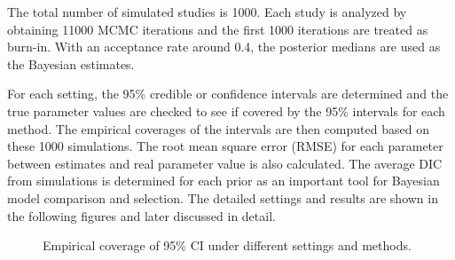 \documentclass[Proceedings]{ascelike}
\begin{document}
The total number of simulated studies is 1000. Each study is analyzed by obtaining 11000 MCMC iterations and the first 1000 iterations are treated as burn-in. With an acceptance rate around 0.4, the posterior medians are used as the Bayesian estimates.

For each setting, the 95\% credible or confidence intervals are determined and the true parameter values are checked to see if covered by the 95\% intervals for each method. The empirical coverages of the intervals are then computed based on these 1000 simulations. The root mean square error (RMSE) for each parameter between estimates and real parameter value is also calculated. The average DIC from simulations is determined for each prior as an important tool for Bayesian model comparison and selection. The detailed settings and results are shown in the following figures and later discussed in detail. 

\begin{figure}[h!]
\centering
{}
\caption{Empirical coverage of 95\% CI under different settings and methods.}
\label{fig:anova_coverage}
\end{figure}
\end{document}
